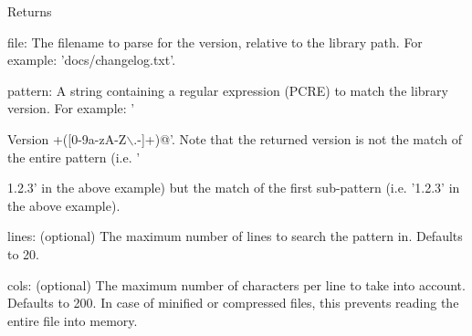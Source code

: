 \begin{DoxyReturn}{Returns}
\begin{DoxyItemize}
\begin{DoxyItemize}
\item file: The filename to parse for the version, relative to the library path. For example: 'docs/changelog.txt'.
\item pattern: A string containing a regular expression (PCRE) to match the library version. For example: '
\end{DoxyItemize}
\end{DoxyItemize}
\end{DoxyReturn}
\begin{DoxyVersion}{Version}
+(\mbox{[}0-\/9a-\/zA-\/Z$\backslash$.-\/\mbox{]}+)@'. Note that the returned version is not the match of the entire pattern (i.e. '

1.2.3' in the above example) but the match of the first sub-\/pattern (i.e. '1.2.3' in the above example).
\begin{DoxyItemize}
\item lines: (optional) The maximum number of lines to search the pattern in. Defaults to 20.
\item cols: (optional) The maximum number of characters per line to take into account. Defaults to 200. In case of minified or compressed files, this prevents reading the entire file into memory.
\end{DoxyItemize}
\end{DoxyVersion}

